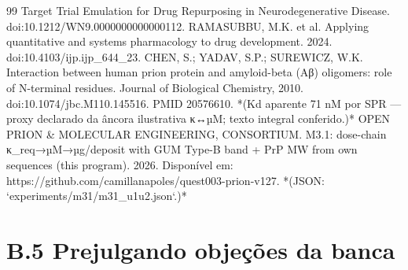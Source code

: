 \documentclass[12pt,a4paper,oneside]{report}
\begin{document}
\begin{thebibliography}{99}
 Target Trial Emulation for Drug Repurposing in Neurodegenerative Disease. doi:10.1212/WN9.0000000000000112.
 RAMASUBBU, M.K. et al. Applying quantitative and systems pharmacology to drug development. 2024. doi:10.4103/ijp.ijp\_644\_23.
 CHEN, S.; YADAV, S.P.; SUREWICZ, W.K. Interaction between human prion protein and amyloid-beta (Aβ) oligomers: role of N-terminal residues. Journal of Biological Chemistry, 2010. doi:10.1074/jbc.M110.145516. PMID 20576610. *(Kd aparente 71 nM por SPR — proxy declarado da âncora ilustrativa κ↔µM; texto integral conferido.)*
 OPEN PRION \& MOLECULAR ENGINEERING, CONSORTIUM. M3.1: dose-chain κ\_req→µM→µg/deposit with GUM Type-B band + PrP MW from own sequences (this program). 2026. Disponível em: https://github.com/camillanapoles/quest003-prion-v127. *(JSON: `experiments/m31/m31\_u1u2.json`.)*
\end{thebibliography}
\appendix
\hypertarget{b.5-prejulgando-objeuxe7uxf5es-da-banca}{%
\section{B.5 Prejulgando objeções da
banca}\label{b.5-prejulgando-objeuxe7uxf5es-da-banca}}
\end{document}
